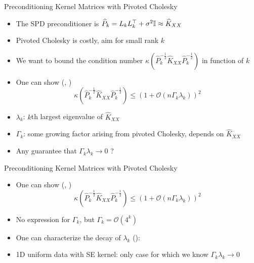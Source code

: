 \documentclass{beamer}
\begin{document}
\begin{frame}{Preconditioning Kernel Matrices with Pivoted Cholesky}
\begin{itemize}[<+->]
    \item The SPD preconditioner is $\widehat P_k = L_k L_k^\top + \sigma^2 \Id \approx \widehat K_{XX}$
    \item Pivoted Cholesky is costly, aim for small rank $k$
    \item We want to bound the condition number $\kappa ( \widehat P_k^{-\frac 1 2} \widehat K_{XX} \widehat P_k^{-\frac 1 2} )$ in function of $k$
    \item One can show (\cite{gardner_gpytorch_2021}, \cite{harbrecht_low-rank_2012})
    \begin{equation*}
        \kappa \left( \widehat P_k^{-\frac 1 2} \widehat K_{XX} \widehat P_k^{-\frac 1 2}  \right) \le (1 + \mathcal O(n\Gamma_k \lambda_k))^2
    \end{equation*}
    \item $\lambda_k$: $k$th largest eigenvalue of $\widehat K_{XX}$
    \item $\Gamma_k$: some growing factor arising from pivoted Cholesky, depends on $\widehat K_{XX}$
    \item Any guarantee that $\Gamma_k \lambda_k \to 0$ ?
\end{itemize}
\end{frame}


\begin{frame}{Preconditioning Kernel Matrices with Pivoted Cholesky}
\begin{itemize}[<+->]
    \item One can show (\cite{gardner_gpytorch_2021}, \cite{harbrecht_low-rank_2012})
    \begin{equation*}
        \kappa \left( \widehat P_k^{-\frac 1 2} \widehat K_{XX} \widehat P_k^{-\frac 1 2}  \right) \le (1 + \mathcal O(n\Gamma_k \lambda_k))^2
    \end{equation*}
    \item No expression for $\Gamma_k$, but $\Gamma_k = \mathcal O(4^k)$
    \item One can characterize the decay of $\lambda_k$ (\cite{gardner_gpytorch_2021, banerjee_parallel_2013, rasmussen_gaussian_2005}):
    \vspace{0.5cm}
    \item 1D uniform data with SE kernel: only case for which we know $\Gamma_k \lambda_k \to 0$
\end{itemize}
\end{frame}
\end{document}
